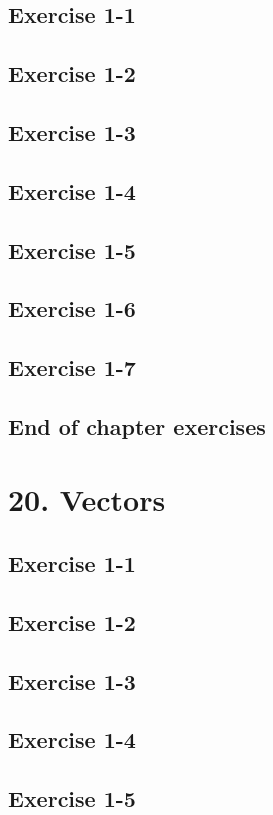 \subsection{Exercise 1-1}
\subsection{Exercise 1-2}
\subsection{Exercise 1-3}
\subsection{Exercise 1-4}
\subsection{Exercise 1-5}
\subsection{Exercise 1-6}
\subsection{Exercise 1-7}
\subsection{End of chapter exercises}
\section{20. Vectors}
\subsection{Exercise 1-1}
\subsection{Exercise 1-2}
\subsection{Exercise 1-3}
\subsection{Exercise 1-4}
\subsection{Exercise 1-5}
